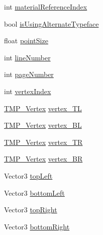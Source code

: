 \begin{DoxyCompactItemize}
\item 
int \mbox{\hyperlink{struct_t_m_pro_1_1_t_m_p___character_info_aec65f6b555fa50bc7b2a5510dd488ef8}{material\+Reference\+Index}}
\item 
bool \mbox{\hyperlink{struct_t_m_pro_1_1_t_m_p___character_info_ab3e0dca9311fe6298de253b8ee1c456f}{is\+Using\+Alternate\+Typeface}}
\item 
float \mbox{\hyperlink{struct_t_m_pro_1_1_t_m_p___character_info_a94ea18169cdf911996043be08f81e7f6}{point\+Size}}
\item 
int \mbox{\hyperlink{struct_t_m_pro_1_1_t_m_p___character_info_a812419a31992a50bbd8343916d897a9b}{line\+Number}}
\item 
int \mbox{\hyperlink{struct_t_m_pro_1_1_t_m_p___character_info_afbde0a1707528528d5b9f89e3500f7b1}{page\+Number}}
\item 
int \mbox{\hyperlink{struct_t_m_pro_1_1_t_m_p___character_info_a92354221459bdb806b3ebbb17bf066da}{vertex\+Index}}
\item 
\mbox{\hyperlink{struct_t_m_pro_1_1_t_m_p___vertex}{T\+M\+P\+\_\+\+Vertex}} \mbox{\hyperlink{struct_t_m_pro_1_1_t_m_p___character_info_a7eab69190af658de10d224148be7779d}{vertex\+\_\+\+TL}}
\item 
\mbox{\hyperlink{struct_t_m_pro_1_1_t_m_p___vertex}{T\+M\+P\+\_\+\+Vertex}} \mbox{\hyperlink{struct_t_m_pro_1_1_t_m_p___character_info_a1db4e65984f8c8ffb59573ca92a11407}{vertex\+\_\+\+BL}}
\item 
\mbox{\hyperlink{struct_t_m_pro_1_1_t_m_p___vertex}{T\+M\+P\+\_\+\+Vertex}} \mbox{\hyperlink{struct_t_m_pro_1_1_t_m_p___character_info_a3584fc81cee8f653bf33fddd299b4cc9}{vertex\+\_\+\+TR}}
\item 
\mbox{\hyperlink{struct_t_m_pro_1_1_t_m_p___vertex}{T\+M\+P\+\_\+\+Vertex}} \mbox{\hyperlink{struct_t_m_pro_1_1_t_m_p___character_info_a3d92945b506fd0055af0d6879452451e}{vertex\+\_\+\+BR}}
\item 
Vector3 \mbox{\hyperlink{struct_t_m_pro_1_1_t_m_p___character_info_ae02056a7b07404e782d8b896be668895}{top\+Left}}
\item 
Vector3 \mbox{\hyperlink{struct_t_m_pro_1_1_t_m_p___character_info_a688fd1ba45a8b65e5234f1a10accd0ca}{bottom\+Left}}
\item 
Vector3 \mbox{\hyperlink{struct_t_m_pro_1_1_t_m_p___character_info_ae52103d8b8b80f1858ab2f4ab9d37d53}{top\+Right}}
\item 
Vector3 \mbox{\hyperlink{struct_t_m_pro_1_1_t_m_p___character_info_aed3f82f8678049a7394fb631ab07fb8a}{bottom\+Right}}
\item 

\end{DoxyCompactItemize}
